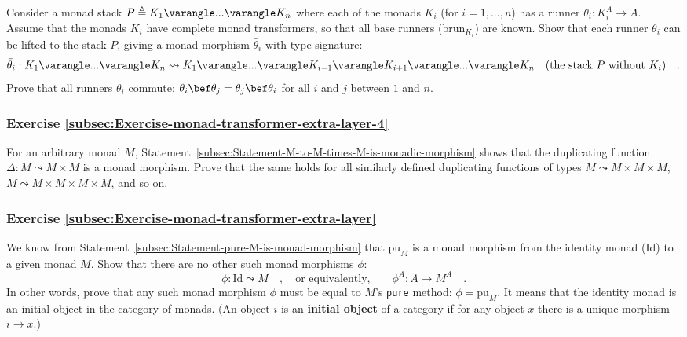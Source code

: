 Consider a monad stack $P\triangleq K_{1}\varangle...\varangle K_{n}$
where each of the monads $K_{i}$ (for $i=1,...,n$) has a runner
$\theta_{i}:K_{i}^{A}\rightarrow A$. Assume that the monads $K_{i}$
have complete monad transformers, so that all base runners ($\text{brun}_{K_{i}}$)
are known. Show that each runner $\theta_{i}$ can be lifted to the
stack $P$, giving a monad morphism $\bar{\theta}_{i}$ with type
signature:
\[
\bar{\theta}_{i}:K_{1}\varangle...\varangle K_{n}\leadsto K_{1}\varangle...\varangle K_{i-1}\varangle K_{i+1}\varangle...\varangle K_{n}\quad\text{(the stack }P\text{ without }K_{i})\quad.
\]
Prove that all runners $\bar{\theta}_{i}$ commute: $\bar{\theta}_{i}\bef\bar{\theta}_{j}=\bar{\theta}_{j}\bef\bar{\theta}_{i}$
for all $i$ and $j$ between $1$ and $n$.

\subsubsection{Exercise \label{subsec:Exercise-monad-transformer-extra-layer-4}\ref{subsec:Exercise-monad-transformer-extra-layer-4} }

For an arbitrary monad $M$, Statement~\ref{subsec:Statement-M-to-M-times-M-is-monadic-morphism}
shows that the duplicating function $\Delta:M\leadsto M\times M$
is a monad morphism. Prove that the same holds for all similarly defined
duplicating functions of types $M\leadsto M\times M\times M$, $M\leadsto M\times M\times M\times M$,
and so on.

\subsubsection{Exercise \label{subsec:Exercise-monad-transformer-extra-layer}\ref{subsec:Exercise-monad-transformer-extra-layer}}

We know from Statement~\ref{subsec:Statement-pure-M-is-monad-morphism}
that $\text{pu}_{M}$ is a monad morphism from the identity monad
($\text{Id}$) to a given monad $M$. Show that there are no other
such monad morphisms $\phi$:
\[
\phi:\text{Id}\leadsto M\quad,\quad\text{or equivalently,}\quad\quad\phi^{A}:A\rightarrow M^{A}\quad.
\]
In other words, prove that any such monad morphism $\phi$ must be
equal to $M$\textsf{'}s \lstinline!pure! method: $\phi=\text{pu}_{M}$. It
means that the identity monad is an initial object
in the category of monads. (An object $i$ is an \textbf{initial object}
of a category if for any object $x$ there is a unique morphism $i\rightarrow x$.)


